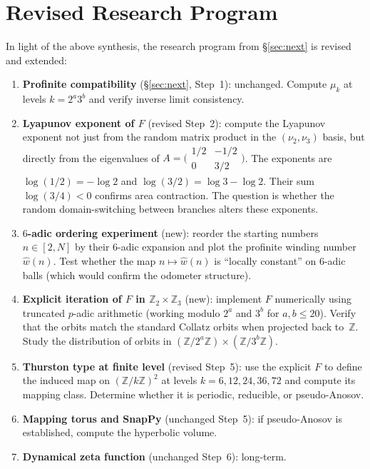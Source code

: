 \documentclass[11pt,a4paper]{article}
\newcommand{\Z}{\mathbb{Z}}
\theoremstyle{plain}
\theoremstyle{definition}
\begin{document}
\section{Revised Research Program}\label{sec:revised}

In light of the above synthesis, the research program from \S\ref{sec:next} is revised and extended:

\begin{enumerate}
    \item \textbf{Profinite compatibility} (\S\ref{sec:next}, Step~1): unchanged. Compute $\mu_k$ at levels $k = 2^a 3^b$ and verify inverse limit consistency.

    \item \textbf{Lyapunov exponent of $F$} (revised Step~2): compute the Lyapunov exponent not just from the random matrix product in the $(\nu_2, \nu_3)$ basis, but directly from the eigenvalues of $A = \bigl(\begin{smallmatrix} 1/2 & -1/2 \\ 0 & 3/2 \end{smallmatrix}\bigr)$. The exponents are $\log(1/2) = -\log 2$ and $\log(3/2) = \log 3 - \log 2$. Their sum $\log(3/4) < 0$ confirms area contraction. The question is whether the random domain-switching between branches alters these exponents.

    \item \textbf{$6$-adic ordering experiment} (new): reorder the starting numbers $n \in [2, N]$ by their $6$-adic expansion and plot the profinite winding number $\hat{w}(n)$. Test whether the map $n \mapsto \hat{w}(n)$ is ``locally constant'' on $6$-adic balls (which would confirm the odometer structure).

    \item \textbf{Explicit iteration of $F$ in $\Z_2 \times \Z_3$} (new): implement $F$ numerically using truncated $p$-adic arithmetic (working modulo $2^a$ and $3^b$ for $a, b \leq 20$). Verify that the orbits match the standard Collatz orbits when projected back to~$\Z$. Study the distribution of orbits in $(\Z/2^a\Z) \times (\Z/3^b\Z)$.

    \item \textbf{Thurston type at finite level} (revised Step~5): use the explicit $F$ to define the induced map on $(\Z/k\Z)^2$ at levels $k = 6, 12, 24, 36, 72$ and compute its mapping class. Determine whether it is periodic, reducible, or pseudo-Anosov.

    \item \textbf{Mapping torus and SnapPy} (unchanged Step~5): if pseudo-Anosov is established, compute the hyperbolic volume.

    \item \textbf{Dynamical zeta function} (unchanged Step~6): long-term.
\end{enumerate}
\end{document}

